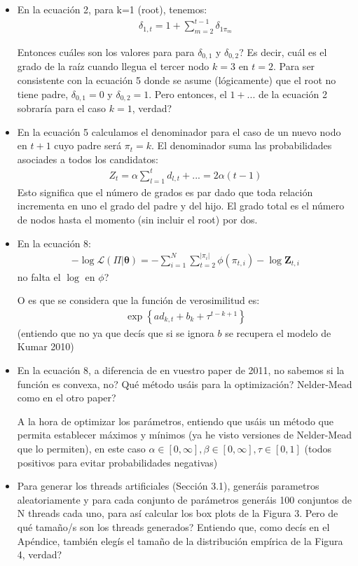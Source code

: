 \documentclass[10pt,a4paper]{article}
\author{Alberto Lumbreras}
\begin{document}
\begin{itemize}

\item En la ecuación 2, para k=1 (root), tenemos:
\begin{align*}
\delta_{1,t} = 1 + \sum_{m=2}^{t-1} \delta_{1\pi_m}
\end{align*} 

Entonces cuáles son los valores para para $\delta_{0,1}$ y $\delta_{0,2}$? Es decir, cuál es el grado de la raíz cuando llegua el tercer nodo $k=3$ en $t=2$. Para ser consistente con la ecuación 5 donde se asume (lógicamente) que el root no tiene padre, $\delta_{0,1}=0$ y $\delta_{0,2}=1$. Pero entonces, el $1+...$ de la ecuación 2 sobraría para el caso $k=1$, verdad? 

\item En la ecuación 5 calculamos el denominador para el caso de un nuevo nodo en $t+1$ cuyo padre será $\pi_t=k$. El denominador suma las probabilidades asociades a todos los candidatos:
\begin{align*}
Z_t = \alpha\sum_{l=1}^t d_{l,t} + ... = 2\alpha(t-1)
\end{align*}
Esto significa que el número de grados es par dado que toda relación incrementa en uno el grado del padre y del hijo. El grado total es el número de nodos hasta el momento (sin incluir el root) por dos.

\item En la ecuación 8:
\begin{align*}
-\log \mathcal{L}(\Pi | \boldsymbol{\theta}) = - \sum_{i=1}^N \sum_{t=2}^{|\pi_i|} \phi(\pi_{t,i}) - \log \mathbf{Z}_{t,i}
\end{align*}
no falta el $\log$ en $\phi$?

O es que se considera que la función de verosimilitud es:
\begin{align*}
\exp \left\lbrace ad_{k,t} + b_k + \tau^{t-k+1}\right\rbrace
\end{align*}
(entiendo que no ya que decís que si se ignora $b$ se recupera el modelo de Kumar 2010)

\item En la ecuación 8, a diferencia de en vuestro paper de 2011, no sabemos si la función es convexa, no? Qué método usáis para la optimización? Nelder-Mead como en el otro paper?

A la hora de optimizar los parámetros, entiendo que usáis un método que permita establecer máximos y mínimos (ya he visto versiones de Nelder-Mead que lo permiten), en este caso $\alpha \in [0, \infty], \beta \in [0, \infty], \tau \in [0, 1]$ (todos positivos para evitar probabilidades negativas)

\item Para generar los threads artificiales (Sección 3.1), generáis parametros aleatoriamente y para cada conjunto de parámetros generáis 100 conjuntos de N threads cada uno, para así calcular los box plots de la Figura 3. Pero de qué tamaño/s son los threads generados? Entiendo que, como decís en el Apéndice, también elegís el tamaño de la distribución empírica de la Figura 4, verdad? 
\end{itemize}
\end{document}
